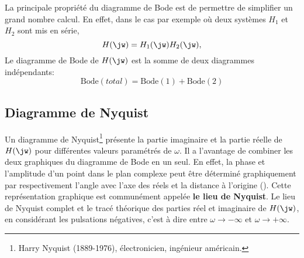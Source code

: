 La principale propriété du diagramme de Bode est de permettre de simplifier un grand nombre calcul.
En effet, dans le cas par exemple où deux systèmes $H_1$ et $H_2$ sont mis en série,
$$                                                                                                                    
H(\jw)=H_1(\jw)H_2(\jw),
$$      
Le diagramme de Bode de $H(\jw)$ est la somme de deux diagrammes indépendants:
$$
\mathrm{Bode}(total)=\mathrm{Bode}(1)+\mathrm{Bode}(2)
$$
\subsection{Diagramme de Nyquist}

Un diagramme de Nyquist\footnote{Harry Nyquist (1889-1976), électronicien, ingénieur américain.} 
présente la partie imaginaire et la partie réelle de $H(\jw)$ pour différentes valeurs paramétrés de $\omega$.
Il a l'avantage de combiner les deux graphiques du diagramme 
de Bode en un seul. En effet, la phase et l'amplitude d'un point dans 
le plan complexe peut être déterminé graphiquement par respectivement l'angle 
avec l'axe des réels et la distance à l'origine (). 
Cette représentation graphique est communément appelée \textbf{le lieu de Nyquist}.
Le lieu de Nyquist complet et le tracé théorique des parties réel et imaginaire de $H(\jw)$, en considérant
les pulsations négatives, c'est à dire entre $\omega\rightarrow-\infty$ et $\omega\rightarrow+\infty$. 

